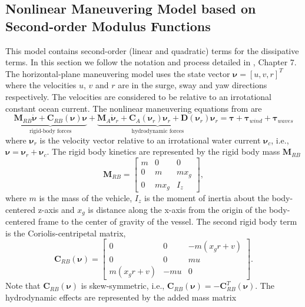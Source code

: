 \documentclass[11pt,draftcls,journal,onecolumn]{IEEEtran}
\begin{document}
\subsection{Nonlinear Maneuvering Model based on Second-order Modulus Functions}\label{s:nonlinearmodel}
This model contains second-order (linear and quadratic) terms for the dissipative terms. In this section we follow the notation and process detailed in \cite{fossen11handbook}, Chapter 7. The horizontal-plane maneuvering model uses the state vector $\bm{\nu}=[u,v,r]^T$ where the velocities $u$, $v$ and $r$ are in the surge, sway and yaw directions respectively.  The velocities are considered to be relative to an irrotational constant ocean current.  The nonlinear maneuvering equations from \cite{fossen11handbook} are
\begin{equation}
\underbrace{\bm{M}_{RB}\dot{\bm{\nu}}+\bm{C}_{RB}(\bm{\nu})\bm{\nu}}_\text{rigid-body forces} +
\underbrace{\bm{M}_A\dot{\bm{\nu}}_r + \bm{C}_A(\bm{\nu}_r)\bm{\nu}_r + 
\bm{D}(\bm{\nu}_r)\bm{\nu}_r}_\text{hydrodynamic forces}
= \bm{\tau}+\bm{\tau}_{wind}+\bm{\tau}_{waves}
\label{e:fossenmodel}
\end{equation}
where $\bm{\nu}_r$ is the velocity vector relative to an irrotational water current $\bm{\nu}_c$, i.e., $\bm{\nu}=\bm{\nu}_r+\bm{\nu}_c$.  The rigid body kinetics are represented by the rigid body mass $\bm{M}_{RB}$ 
\begin{equation}
\bm{M}_{RB}= \left[ 
\begin{array}{ccc}
m & 0 & 0 \\
0 & m & m x_g \\
0 & m x_g & I_z 
\end{array} \right],
\end{equation}
where $m$ is the mass of the vehicle, $I_z$ is the moment of inertia about the body-centered z-axis and $x_g$ is distance along the x-axis from the origin of the body-centered frame to the center of gravity of the vessel.  The second rigid body term is the Coriolis-centripetal matrix,
\begin{equation}
\bm{C}_{RB}(\bm{\nu})= \left[ 
\begin{array}{ccc}
0 & 0 & -m(x_gr+v) \\
0 & 0 & mu \\
m(x_gr+v) & -mu  & 0 
\end{array} \right].
\end{equation}
Note that $\bm{C}_{RB}(\bm{\nu})$ is skew-symmetric, i.e., $\bm{C}_{RB}(\bm{\nu})=-\bm{C}_{RB}^T(\bm{\nu})$.  The hydrodynamic effects are represented by the added mass matrix
\end{document}
